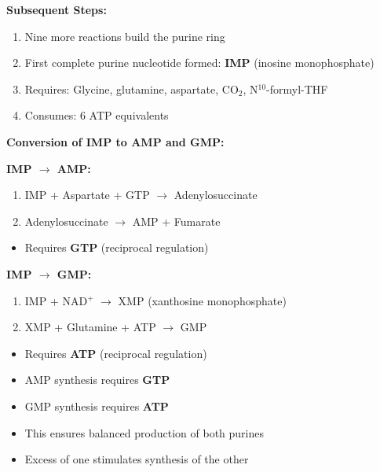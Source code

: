 \textbf{Subsequent Steps:}
\begin{enumerate}
    \item Nine more reactions build the purine ring
    \item First complete purine nucleotide formed: \textbf{IMP} (inosine monophosphate)
    \item Requires: Glycine, glutamine, aspartate, CO$_2$, N$^{10}$-formyl-THF
    \item Consumes: 6 ATP equivalents
\end{enumerate}

\textbf{Conversion of IMP to AMP and GMP:}

\textbf{IMP $\rightarrow$ AMP:}
\begin{enumerate}
    \item IMP + Aspartate + GTP $\rightarrow$ Adenylosuccinate
    \item Adenylosuccinate $\rightarrow$ AMP + Fumarate
\end{enumerate}
\begin{itemize}
    \item Requires \textbf{GTP} (reciprocal regulation)
\end{itemize}

\textbf{IMP $\rightarrow$ GMP:}
\begin{enumerate}
    \item IMP + NAD$^+$ $\rightarrow$ XMP (xanthosine monophosphate)
    \item XMP + Glutamine + ATP $\rightarrow$ GMP
\end{enumerate}
\begin{itemize}
    \item Requires \textbf{ATP} (reciprocal regulation)
\end{itemize}

\begin{tcolorbox}[colback=yellow!10, colframe=yellow!70!black, title=\textbf{Reciprocal Regulation of AMP and GMP Synthesis}]
\begin{itemize}
    \item AMP synthesis requires \textbf{GTP}
    \item GMP synthesis requires \textbf{ATP}
    \item This ensures balanced production of both purines
    \item Excess of one stimulates synthesis of the other
\end{itemize}
\end{tcolorbox}

